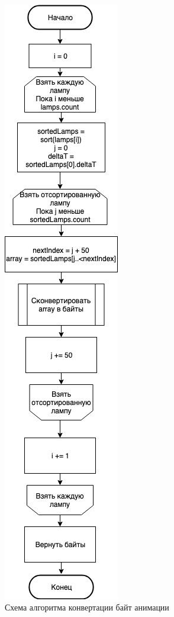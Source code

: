 ~
\begin{figure}[H]
\centering
	\includegraphics[scale=0.5]{figures/bytesSending.png}
	\caption{Схема алгоритма конвертации байт анимации}
	\label{fig:appendices:algorithms:bytesSending}
\end{figure}
